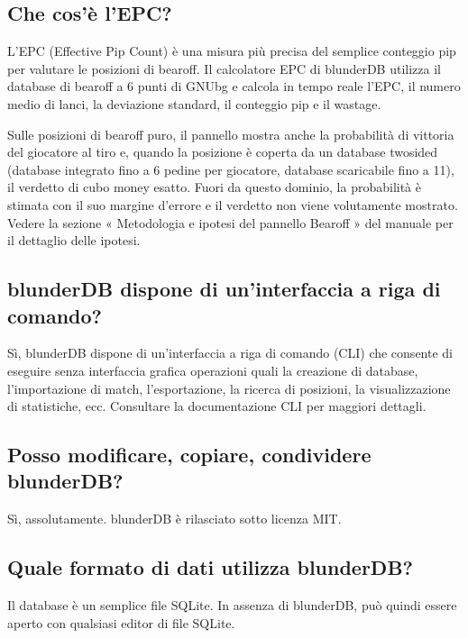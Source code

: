 \documentclass[letterpaper,10pt,italian]{sphinxmanual}
\begin{document}
\subsection{Che cos’è l’EPC?}
\label{\detokenize{faq:qu-est-ce-que-l-epc}}
\sphinxAtStartPar
L’EPC (Effective Pip Count) è una misura più precisa del semplice conteggio pip per valutare le posizioni di bear\sphinxhyphen{}off. Il calcolatore EPC di blunderDB utilizza il database di bear\sphinxhyphen{}off a 6 punti di GNUbg e calcola in tempo reale l’EPC, il numero medio di lanci, la deviazione standard, il conteggio pip e il wastage.

\sphinxAtStartPar
Sulle posizioni di bearoff puro, il pannello mostra anche la probabilità di vittoria del giocatore al tiro e, quando la posizione è coperta da un database two\sphinxhyphen{}sided (database integrato fino a 6 pedine per giocatore, database scaricabile fino a 11), il verdetto di cubo money esatto. Fuori da questo dominio, la probabilità è stimata con il suo margine d’errore e il verdetto non viene volutamente mostrato. Vedere la sezione « Metodologia e ipotesi del pannello Bearoff » del manuale per il dettaglio delle ipotesi.


\subsection{blunderDB dispone di un’interfaccia a riga di comando?}
\label{\detokenize{faq:blunderdb-dispose-t-il-d-une-interface-en-ligne-de-commande}}
\sphinxAtStartPar
Sì, blunderDB dispone di un’interfaccia a riga di comando (CLI) che consente di eseguire senza interfaccia grafica operazioni quali la creazione di database, l’importazione di match, l’esportazione, la ricerca di posizioni, la visualizzazione di statistiche, ecc. Consultare la documentazione CLI per maggiori dettagli.


\subsection{Posso modificare, copiare, condividere blunderDB?}
\label{\detokenize{faq:puis-je-modifier-copier-partager-blunderdb}}
\sphinxAtStartPar
Sì, assolutamente. blunderDB è rilasciato sotto licenza MIT.


\subsection{Quale formato di dati utilizza blunderDB?}
\label{\detokenize{faq:quel-format-de-donnees-utilise-blunderdb}}
\sphinxAtStartPar
Il database è un semplice file SQLite. In assenza di blunderDB, può quindi essere aperto con qualsiasi editor di file SQLite.
\end{document}
